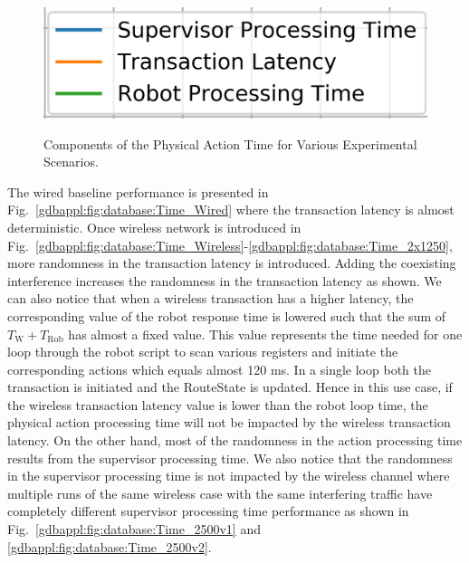 \begin{figure}[!ht]
	\quad
	{\includegraphics[width=.42\columnwidth]{chapter-gdb-appl/figures/database/Legend.png}}
	\caption{Components of the Physical Action Time for Various Experimental Scenarios.\vspace{-0.2in}}
	\label{gdbappl:fig:database:Time}
\end{figure}

The wired baseline performance is presented in Fig.~\ref{gdbappl:fig:database:Time_Wired} where the transaction latency is almost deterministic. Once wireless network is introduced in Fig.~\ref{gdbappl:fig:database:Time_Wireless}-\ref{gdbappl:fig:database:Time_2x1250}, more randomness in the transaction latency is introduced. Adding the coexisting interference increases the randomness in the transaction latency as shown. We can also notice that when a wireless transaction has a higher latency, the corresponding value of the robot response time is lowered such that the sum of $T_\text{W}+T_\text{Rob}$ has almost a fixed value. This value represents the time needed for one loop through the robot script to scan various registers and initiate the corresponding actions which equals almost 120 ms. In a single loop both the transaction is initiated and the RouteState is updated. Hence in this use case, if the wireless transaction latency value is lower than the robot loop time, the physical action processing time will not be impacted by the wireless transaction latency. On the other hand, most of the randomness in the action processing time results from the supervisor processing time. We also notice that the randomness in the supervisor processing time is not impacted by the wireless channel where multiple runs of the same wireless case with the same interfering traffic have completely different supervisor processing time performance as shown in Fig.~\ref{gdbappl:fig:database:Time_2500v1} and \ref{gdbappl:fig:database:Time_2500v2}.   
     
